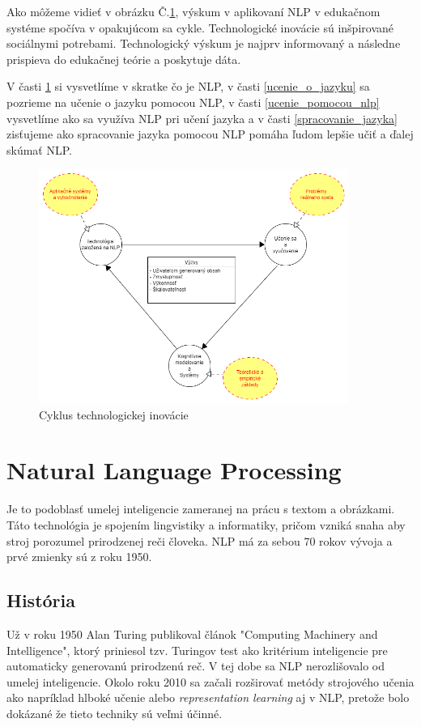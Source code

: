 \documentclass[10pt,slovak,a4paper,twoside]{article}
\begin{document}
Ako môžeme vidieť v obrázku Č.\ref{nlp_obrazok}, výskum v aplikovaní NLP v edukačnom systéme spočíva v opakujúcom sa cykle. 
Technologické inovácie sú inšpirované sociálnymi potrebami. Technologický výskum je najprv informovaný a následne prispieva 
do edukačnej teórie a poskytuje dáta.

V časti \ref{NLP} si vysvetlíme v skratke čo je NLP, v časti \ref{ucenie_o_jazyku} sa pozrieme na učenie o jazyku pomocou NLP, 
v časti \ref{ucenie_pomocou_nlp} vysvetlíme ako sa využíva NLP pri učení jazyka a v časti \ref{spracovanie_jazyka} zisťujeme ako 
spracovanie jazyka pomocou NLP pomáha ľudom lepšie učiť a ďalej skúmať NLP.
\begin{framed}
\begin{figure}[H]\label{nlp_obrazok}
	\includegraphics[width=0.9\textwidth]{nlp}
	\centering
	\caption{Cyklus technologickej inovácie\cite{litman2016natural}}
\end{figure}
\end{framed}
\section{Natural Language Processing} \label{NLP}
Je to podoblasť umelej inteligencie zameranej na prácu s textom a obrázkami.  
Táto technológia je spojením lingvistiky a informatiky, 
pričom vzniká snaha aby stroj porozumel prirodzenej reči človeka.
NLP má za sebou 70 rokov vývoja a prvé zmienky sú z roku 1950\cite{historia}.
\subsection{História}
	Už v roku 1950 Alan Turing publikoval článok "Computing Machinery and Intelligence"\cite{turing2009computing}, 
	ktorý priniesol tzv. Turingov test ako kritérium inteligencie pre automaticky generovanú 
	prirodzenú reč. V tej dobe sa NLP nerozlišovalo od umelej inteligencie.\linebreak
	Okolo roku 2010 sa začali rozširovať metódy strojového učenia ako napríklad hlboké učenie alebo 
	\textit{representation learning} aj v NLP, pretože bolo dokázané že tieto techniky sú veľmi účinné.
\end{document}
